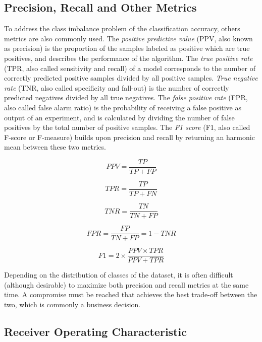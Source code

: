 \documentclass{kththesis}
\begin{document}
\subsection{Precision, Recall and Other Metrics}

To address the class imbalance problem of the classification accuracy, others metrics are also commonly used. The \emph{positive predictive value} (PPV, also known as precision) is the proportion of the samples labeled as positive which are true positives, and describes the performance of the algorithm. The \emph{true positive rate} (TPR, also called sensitivity and recall) of a model corresponds to the number of correctly predicted positive samples divided by all positive samples. \emph{True negative rate} (TNR, also called specificity and fall-out) is the number of correctly predicted negatives divided by all true negatives. The \emph{false positive rate} (FPR, also called false alarm ratio) is the probability of receiving a false positive as output of an experiment, and is calculated by dividing the number of false positives by the total number of positive samples. The \emph{F1 score} (F1, also called F-score or F-measure) builds upon precision and recall by returning an harmonic mean between these two metrics.

\begin{equation}
PPV = \frac{TP}{TP + FP}
\end{equation}

\begin{equation}
TPR = \frac{TP}{TP + FN}
\end{equation}

\begin{equation}
TNR = \frac{TN}{TN + FP}
\end{equation}

\begin{equation}
FPR = \frac{FP}{TN + FP} = 1 - TNR
\end{equation}

\begin{equation}
F1 = 2 \times \frac{PPV \times TPR}{PPV + TPR}
\end{equation}

Depending on the distribution of classes of the dataset, it is often difficult (although desirable) to maximize both precision and recall metrics at the same time. A compromise must be reached that achieves the best trade-off between the two, which is commonly a business decision.

\subsection{Receiver Operating Characteristic}
\end{document}
